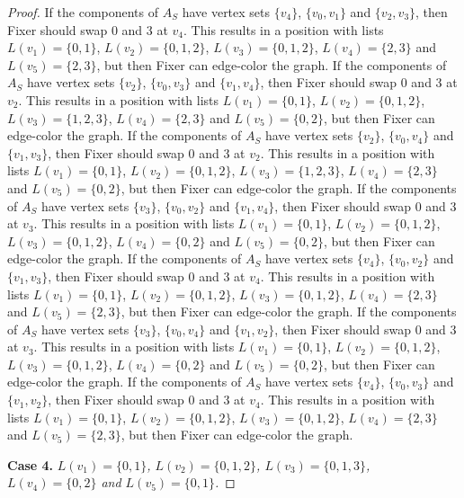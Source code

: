 \documentclass[12pt]{amsart}
\theoremstyle{plain}
\theoremstyle{definition}
\theoremstyle{remark}
\begin{document}
\begin{proof}
If the components of $A_S$ have vertex sets $\{v_4\}$, $\{v_0, v_1\}$ and $\{v_2, v_3\}$, then Fixer should swap 0 and 3 at $v_4$. This results in a position with lists $L(v_1) = \{0, 1\}$, $L(v_2) = \{0, 1, 2\}$, $L(v_3) = \{0, 1, 2\}$, $L(v_4) = \{2, 3\}$ and $L(v_5) = \{2, 3\}$, but then Fixer can edge-color the graph.
If the components of $A_S$ have vertex sets $\{v_2\}$, $\{v_0, v_3\}$ and $\{v_1, v_4\}$, then Fixer should swap 0 and 3 at $v_2$. This results in a position with lists $L(v_1) = \{0, 1\}$, $L(v_2) = \{0, 1, 2\}$, $L(v_3) = \{1, 2, 3\}$, $L(v_4) = \{2, 3\}$ and $L(v_5) = \{0, 2\}$, but then Fixer can edge-color the graph.
If the components of $A_S$ have vertex sets $\{v_2\}$, $\{v_0, v_4\}$ and $\{v_1, v_3\}$, then Fixer should swap 0 and 3 at $v_2$. This results in a position with lists $L(v_1) = \{0, 1\}$, $L(v_2) = \{0, 1, 2\}$, $L(v_3) = \{1, 2, 3\}$, $L(v_4) = \{2, 3\}$ and $L(v_5) = \{0, 2\}$, but then Fixer can edge-color the graph.
If the components of $A_S$ have vertex sets $\{v_3\}$, $\{v_0, v_2\}$ and $\{v_1, v_4\}$, then Fixer should swap 0 and 3 at $v_3$. This results in a position with lists $L(v_1) = \{0, 1\}$, $L(v_2) = \{0, 1, 2\}$, $L(v_3) = \{0, 1, 2\}$, $L(v_4) = \{0, 2\}$ and $L(v_5) = \{0, 2\}$, but then Fixer can edge-color the graph.
If the components of $A_S$ have vertex sets $\{v_4\}$, $\{v_0, v_2\}$ and $\{v_1, v_3\}$, then Fixer should swap 0 and 3 at $v_4$. This results in a position with lists $L(v_1) = \{0, 1\}$, $L(v_2) = \{0, 1, 2\}$, $L(v_3) = \{0, 1, 2\}$, $L(v_4) = \{2, 3\}$ and $L(v_5) = \{2, 3\}$, but then Fixer can edge-color the graph.
If the components of $A_S$ have vertex sets $\{v_3\}$, $\{v_0, v_4\}$ and $\{v_1, v_2\}$, then Fixer should swap 0 and 3 at $v_3$. This results in a position with lists $L(v_1) = \{0, 1\}$, $L(v_2) = \{0, 1, 2\}$, $L(v_3) = \{0, 1, 2\}$, $L(v_4) = \{0, 2\}$ and $L(v_5) = \{0, 2\}$, but then Fixer can edge-color the graph.
If the components of $A_S$ have vertex sets $\{v_4\}$, $\{v_0, v_3\}$ and $\{v_1, v_2\}$, then Fixer should swap 0 and 3 at $v_4$. This results in a position with lists $L(v_1) = \{0, 1\}$, $L(v_2) = \{0, 1, 2\}$, $L(v_3) = \{0, 1, 2\}$, $L(v_4) = \{2, 3\}$ and $L(v_5) = \{2, 3\}$, but then Fixer can edge-color the graph.

\noindent\textbf{Case 4.  }\textit{$L(v_1) = \{0, 1\}$, $L(v_2) = \{0, 1, 2\}$, $L(v_3) = \{0, 1, 3\}$, $L(v_4) = \{0, 2\}$ and $L(v_5) = \{0, 1\}$.}


\end{proof}
\end{document}
